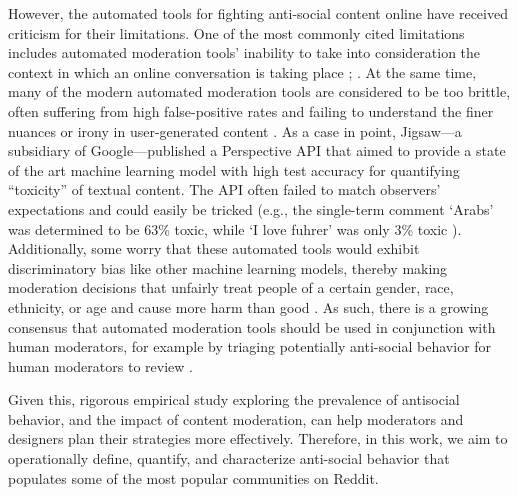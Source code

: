However, the automated tools for fighting anti-social content online have received criticism for their limitations. One of the most commonly cited limitations includes automated moderation tools’ inability to take into consideration the context in which an online conversation is taking place \cite{30_MSB, 31_Lessig, 48_Pater}; . At the same time, many of the modern automated moderation tools are considered to be too brittle, often suffering from high false-positive rates and failing to understand the finer nuances or irony in user-generated content \cite{49_Sood, 50_Brody, 51_Chancellor, 52_li}. As a case in point, Jigsaw---a subsidiary of Google---published a Perspective API that aimed to provide a state of the art machine learning model with high test accuracy for quantifying ``toxicity'' of textual content. The API often failed to match observers’ expectations and could easily be tricked (e.g., the single-term comment ‘Arabs’ was determined to be 63\% toxic, while ‘I love fuhrer’ was only 3\% toxic \cite{53_Sinders}). Additionally, some worry that these automated tools would exhibit discriminatory bias like other machine learning models, thereby making moderation decisions that unfairly treat people of a certain gender, race, ethnicity, or age and cause more harm than good \cite{54_Diaz, 55_Blodgett, 56_Zehlike, 57_Barocas}. As such, there is a growing consensus that automated moderation tools should be used in conjunction with human moderators, for example by triaging potentially anti-social behavior for human moderators to review \cite{28_Gorwa, chandrasekharan2019crossmod}. 

Given this, rigorous empirical study exploring the prevalence of antisocial behavior, and the impact of content moderation, can help moderators and designers plan their strategies more effectively. Therefore, in this work, we aim to operationally define, quantify, and characterize anti-social behavior that populates some of the most popular communities on Reddit. 